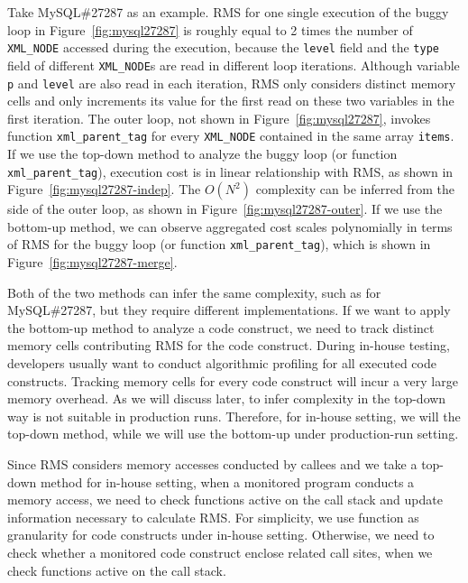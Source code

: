 Take MySQL\#27287 as an example.
RMS for one single execution of
the buggy loop in Figure~\ref{fig:mysql27287}
is roughly equal to 2 times the number of \texttt{XML\_NODE} 
accessed during the execution, 
because the \texttt{level} field and the \texttt{type} field of 
different \texttt{XML\_NODE}s are read in different loop iterations.
Although variable \texttt{p} and \texttt{level} are also read in each iteration,
RMS only considers distinct memory cells and 
only increments its value for the first read on these two variables in the first iteration. 
The outer loop, not shown in Figure~\ref{fig:mysql27287}, 
invokes function \texttt{xml\_parent\_tag} for every \texttt{XML\_NODE} contained
in the same array \texttt{items}.
If we use the top-down method to analyze the buggy loop
(or function \texttt{xml\_parent\_tag}), 
execution cost is in linear relationship with RMS, 
as shown in Figure~\ref{fig:mysql27287-indep}.
The $O(N^2)$ complexity can be inferred from the side of the outer loop, 
as shown in Figure~\ref{fig:mysql27287-outer}. 
If we use the bottom-up method, 
we can observe aggregated cost scales 
polynomially in terms of RMS for the buggy loop 
(or function \texttt{xml\_parent\_tag}), 
which is shown in Figure~\ref{fig:mysql27287-merge}. 


Both of the two methods can infer the same complexity, such as for MySQL\#27287,
but they require different implementations.
If we want to apply the bottom-up method to analyze a code construct,
we need to track distinct memory cells contributing RMS for the code construct.
During in-house testing, developers usually want to conduct algorithmic profiling 
for all executed code constructs. 
Tracking memory cells for every code construct will 
incur a very large memory overhead.  
As we will discuss later, to infer complexity in the top-down way 
is not suitable in production runs. 
Therefore, for in-house setting, we will the top-down method, 
while we will use the bottom-up under production-run setting. 

Since RMS considers memory accesses conducted by callees 
and we take a top-down method for in-house setting,
when a monitored program conducts a memory access,
we need to check functions active on the call stack and 
update information necessary to calculate RMS. 
For simplicity, we use function as granularity for code constructs under in-house setting.
Otherwise, we need to check whether a monitored code construct enclose related call sites, 
when we check functions active on the call stack.  





